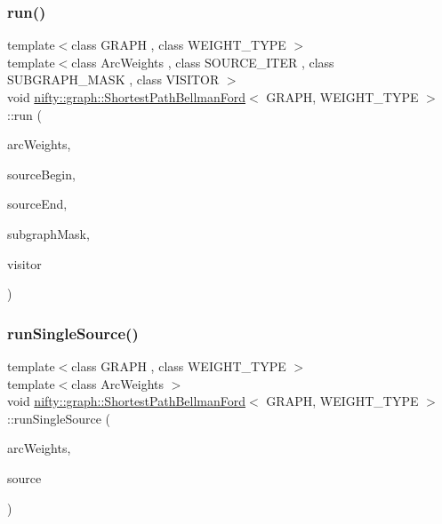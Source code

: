 \mbox{\label{classnifty_1_1graph_1_1ShortestPathBellmanFord_ac70ef6c0b842b0ff7b7046d73e79a08c}} 
\subsubsection{\texorpdfstring{run()}{run()}}
{\footnotesize\ttfamily template$<$class G\+R\+A\+PH , class W\+E\+I\+G\+H\+T\+\_\+\+T\+Y\+PE $>$ \\
template$<$class Arc\+Weights , class S\+O\+U\+R\+C\+E\+\_\+\+I\+T\+ER , class S\+U\+B\+G\+R\+A\+P\+H\+\_\+\+M\+A\+SK , class V\+I\+S\+I\+T\+OR $>$ \\
void \hyperlink{classnifty_1_1graph_1_1ShortestPathBellmanFord}{nifty\+::graph\+::\+Shortest\+Path\+Bellman\+Ford}$<$ G\+R\+A\+PH, W\+E\+I\+G\+H\+T\+\_\+\+T\+Y\+PE $>$\+::run (\begin{DoxyParamCaption}\item[{Arc\+Weights}]{arc\+Weights,  }\item[{S\+O\+U\+R\+C\+E\+\_\+\+I\+T\+ER}]{source\+Begin,  }\item[{S\+O\+U\+R\+C\+E\+\_\+\+I\+T\+ER}]{source\+End,  }\item[{const S\+U\+B\+G\+R\+A\+P\+H\+\_\+\+M\+A\+SK \&}]{subgraph\+Mask,  }\item[{V\+I\+S\+I\+T\+OR \&\&}]{visitor }\end{DoxyParamCaption})\hspace{0.3cm}{\ttfamily [inline]}}

\mbox{\label{classnifty_1_1graph_1_1ShortestPathBellmanFord_a2a400586a2b42f61751668b9e4539b62}} 
\subsubsection{\texorpdfstring{run\+Single\+Source()}{runSingleSource()}}
{\footnotesize\ttfamily template$<$class G\+R\+A\+PH , class W\+E\+I\+G\+H\+T\+\_\+\+T\+Y\+PE $>$ \\
template$<$class Arc\+Weights $>$ \\
void \hyperlink{classnifty_1_1graph_1_1ShortestPathBellmanFord}{nifty\+::graph\+::\+Shortest\+Path\+Bellman\+Ford}$<$ G\+R\+A\+PH, W\+E\+I\+G\+H\+T\+\_\+\+T\+Y\+PE $>$\+::run\+Single\+Source (\begin{DoxyParamCaption}\item[{Arc\+Weights}]{arc\+Weights,  }\item[{const int64\+\_\+t}]{source }\end{DoxyParamCaption})\hspace{0.3cm}{\ttfamily [inline]}}


